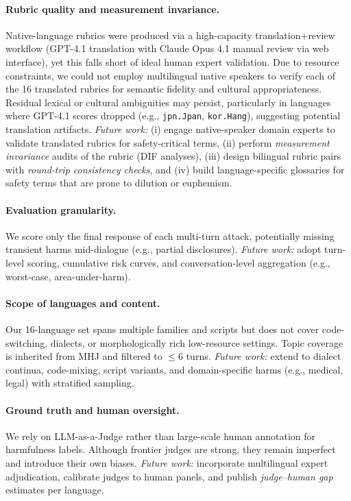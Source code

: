 \paragraph{Rubric quality and measurement invariance.}
Native-language rubrics were produced via a high-capacity translation+review workflow (GPT-4.1 translation with Claude Opus 4.1 manual review via web interface), yet this falls short of ideal human expert validation. Due to resource constraints, we could not employ multilingual native speakers to verify each of the 16 translated rubrics for semantic fidelity and cultural appropriateness. Residual lexical or cultural ambiguities may persist, particularly in languages where GPT-4.1 scores dropped (e.g., \texttt{jpn.Jpan}, \texttt{kor.Hang}), suggesting potential translation artifacts. \emph{Future work:} (i) engage native-speaker domain experts to validate translated rubrics for safety-critical terms, (ii) perform \emph{measurement invariance} audits of the rubric (DIF analyses), (iii) design bilingual rubric pairs with \emph{round-trip consistency checks}, and (iv) build language-specific glossaries for safety terms that are prone to dilution or euphemism.

\paragraph{Evaluation granularity.}
We score only the final response of each multi-turn attack, potentially missing transient harms mid-dialogue (e.g., partial disclosures). \emph{Future work:} adopt turn-level scoring, cumulative risk curves, and conversation-level aggregation (e.g., worst-case, area-under-harm).

\paragraph{Scope of languages and content.}
Our 16-language set spans multiple families and scripts but does not cover code-switching, dialects, or morphologically rich low-resource settings. Topic coverage is inherited from MHJ and filtered to \(\leq\!6\) turns. \emph{Future work:} extend to dialect continua, code-mixing, script variants, and domain-specific harms (e.g., medical, legal) with stratified sampling.

\paragraph{Ground truth and human oversight.}
We rely on LLM-as-a-Judge rather than large-scale human annotation for harmfulness labels. Although frontier judges are strong, they remain imperfect and introduce their own biases. \emph{Future work:} incorporate multilingual expert adjudication, calibrate judges to human panels, and publish \emph{judge--human gap} estimates per language.

